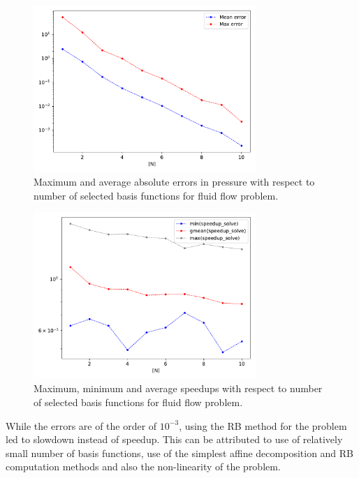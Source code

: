 \documentclass[11pt, oneside]{article}
\begin{document}
\begin{figure}[h!]
    \centering
    \includegraphics[width=0.75\textwidth]{figures/output_error_p.pdf}
    \caption{Maximum and average absolute errors in pressure with respect to number of selected basis functions for fluid flow problem.}
    \label{fig:NS_err_p}
\end{figure}

\begin{figure}[h!]
    \centering
    \includegraphics[width=0.75\textwidth]{figures/speedup_solve.pdf}
    \caption{Maximum, minimum and average speedups with respect to number of selected basis functions for fluid flow problem.}
    \label{fig:NS_spdup}
\end{figure}

While the errors are of the order of $10^{-3}$, using the RB method for the problem led to slowdown instead of speedup. This can be attributed to use of relatively small number of basis functions, use of the simplest affine decomposition and RB computation methods and also the non-linearity of the problem.
\end{document}
